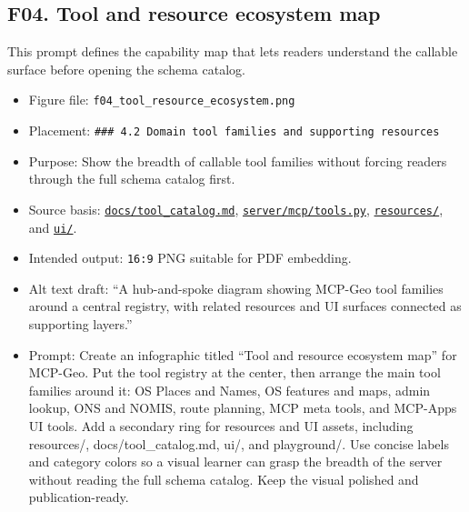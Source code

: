 \subsection{F04. Tool and resource ecosystem
map}\label{f04.-tool-and-resource-ecosystem-map}

This prompt defines the capability map that lets readers understand the
callable surface before opening the schema catalog.

\begin{itemize}
\tightlist
\item
  Figure file: \texttt{f04\_tool\_resource\_ecosystem.png}
\item
  Placement:
  \texttt{\#\#\#\ 4.2\ Domain\ tool\ families\ and\ supporting\ resources}
\item
  Purpose: Show the breadth of callable tool families without forcing
  readers through the full schema catalog first.
\item
  Source basis:
  \href{https://github.com/chris-page-gov/mcp-geo/blob/fe862910da246ca77f374cfbe484985f5df4d316/docs/tool_catalog.md\#L1-L61}{\texttt{docs/tool\_catalog.md}},
  \href{https://github.com/chris-page-gov/mcp-geo/blob/fe862910da246ca77f374cfbe484985f5df4d316/server/mcp/tools.py}{\texttt{server/mcp/tools.py}},
  \href{https://github.com/chris-page-gov/mcp-geo/tree/fe862910da246ca77f374cfbe484985f5df4d316/resources}{\texttt{resources/}},
  and
  \href{https://github.com/chris-page-gov/mcp-geo/tree/fe862910da246ca77f374cfbe484985f5df4d316/ui}{\texttt{ui/}}.
\item
  Intended output: \texttt{16:9} PNG suitable for PDF embedding.
\item
  Alt text draft: ``A hub-and-spoke diagram showing MCP-Geo tool
  families around a central registry, with related resources and UI
  surfaces connected as supporting layers.''
\item
  Prompt: Create an infographic titled ``Tool and resource ecosystem
  map'' for MCP-Geo. Put the tool registry at the center, then arrange
  the main tool families around it: OS Places and Names, OS features and
  maps, admin lookup, ONS and NOMIS, route planning, MCP meta tools, and
  MCP-Apps UI tools. Add a secondary ring for resources and UI assets,
  including resources/, docs/tool\_catalog.md, ui/, and playground/. Use
  concise labels and category colors so a visual learner can grasp the
  breadth of the server without reading the full schema catalog. Keep
  the visual polished and publication-ready.
\end{itemize}

